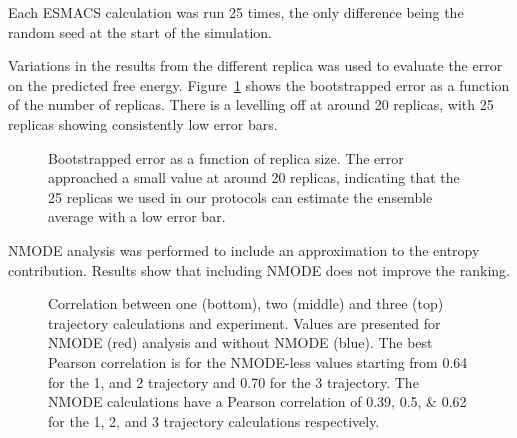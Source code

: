 Each ESMACS calculation was run 25 times, the only difference being the random seed at the start of the simulation. 

Variations in the results from the different replica was used to evaluate the error on the predicted free energy. Figure~\ref{fig:bootstrap} shows the bootstrapped error as a function of the number of replicas. There is a levelling off at around 20 replicas, with 25 replicas showing consistently low error bars.

\begin{figure}
  \centering
  
  \caption{Bootstrapped error as a function of replica size. The error approached a small value at around 20 replicas, indicating that the 25 replicas we used in our protocols can estimate the ensemble average with a low error bar.}
  \label{fig:bootstrap}
\end{figure}


NMODE analysis was performed to include an approximation to the entropy contribution. Results show that including NMODE does not improve the ranking. 

\begin{figure}
	
	\caption{Correlation between one (bottom), two (middle) and three (top) trajectory calculations and experiment. Values are presented for NMODE (red) analysis and without NMODE (blue). The best Pearson correlation is for the NMODE-less values starting from \num{0.64} for the 1, and 2 trajectory and \num{0.70} for the 3 trajectory. The NMODE calculations have a Pearson correlation of \numlist{0.39; 0.5; 0.62} for the 1, 2, and 3 trajectory calculations respectively.}
	\label{fig:mmpbsa}
\end{figure}
